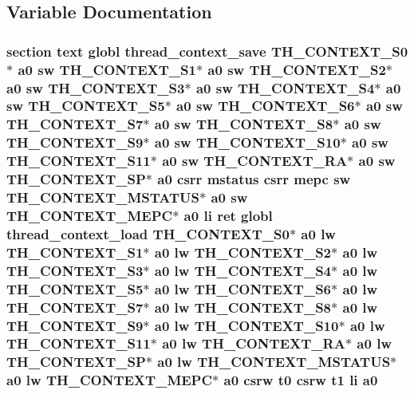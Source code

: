 \subsection{Variable Documentation}
\hypertarget{riscv_2threada_8S_aaef62817c8f68f920ec8214f18b86a4c}{
\subsubsection[{a0}]{\setlength{\rightskip}{0pt plus 5cm}section text globl {\bf thread\-\_\-context\-\_\-save} {\bf T\-H\-\_\-\-C\-O\-N\-T\-E\-X\-T\-\_\-\-S0}$\ast$ a0 {\bf sw} {\bf T\-H\-\_\-\-C\-O\-N\-T\-E\-X\-T\-\_\-\-S1}$\ast$ a0 {\bf sw} {\bf T\-H\-\_\-\-C\-O\-N\-T\-E\-X\-T\-\_\-\-S2}$\ast$ a0 {\bf sw} {\bf T\-H\-\_\-\-C\-O\-N\-T\-E\-X\-T\-\_\-\-S3}$\ast$ a0 {\bf sw} {\bf T\-H\-\_\-\-C\-O\-N\-T\-E\-X\-T\-\_\-\-S4}$\ast$ a0 {\bf sw} {\bf T\-H\-\_\-\-C\-O\-N\-T\-E\-X\-T\-\_\-\-S5}$\ast$ a0 {\bf sw} {\bf T\-H\-\_\-\-C\-O\-N\-T\-E\-X\-T\-\_\-\-S6}$\ast$ a0 {\bf sw} {\bf T\-H\-\_\-\-C\-O\-N\-T\-E\-X\-T\-\_\-\-S7}$\ast$ a0 {\bf sw} {\bf T\-H\-\_\-\-C\-O\-N\-T\-E\-X\-T\-\_\-\-S8}$\ast$ a0 {\bf sw} {\bf T\-H\-\_\-\-C\-O\-N\-T\-E\-X\-T\-\_\-\-S9}$\ast$ a0 {\bf sw} {\bf T\-H\-\_\-\-C\-O\-N\-T\-E\-X\-T\-\_\-\-S10}$\ast$ a0 {\bf sw} {\bf T\-H\-\_\-\-C\-O\-N\-T\-E\-X\-T\-\_\-\-S11}$\ast$ a0 {\bf sw} {\bf T\-H\-\_\-\-C\-O\-N\-T\-E\-X\-T\-\_\-\-R\-A}$\ast$ a0 {\bf sw} {\bf T\-H\-\_\-\-C\-O\-N\-T\-E\-X\-T\-\_\-\-S\-P}$\ast$ a0 csrr {\bf mstatus} csrr {\bf mepc} {\bf sw} {\bf T\-H\-\_\-\-C\-O\-N\-T\-E\-X\-T\-\_\-\-M\-S\-T\-A\-T\-U\-S}$\ast$ a0 {\bf sw} {\bf T\-H\-\_\-\-C\-O\-N\-T\-E\-X\-T\-\_\-\-M\-E\-P\-C}$\ast$ a0 {\bf li} ret globl {\bf thread\-\_\-context\-\_\-load} {\bf T\-H\-\_\-\-C\-O\-N\-T\-E\-X\-T\-\_\-\-S0}$\ast$ a0 {\bf lw} {\bf T\-H\-\_\-\-C\-O\-N\-T\-E\-X\-T\-\_\-\-S1}$\ast$ a0 {\bf lw} {\bf T\-H\-\_\-\-C\-O\-N\-T\-E\-X\-T\-\_\-\-S2}$\ast$ a0 {\bf lw} {\bf T\-H\-\_\-\-C\-O\-N\-T\-E\-X\-T\-\_\-\-S3}$\ast$ a0 {\bf lw} {\bf T\-H\-\_\-\-C\-O\-N\-T\-E\-X\-T\-\_\-\-S4}$\ast$ a0 {\bf lw} {\bf T\-H\-\_\-\-C\-O\-N\-T\-E\-X\-T\-\_\-\-S5}$\ast$ a0 {\bf lw} {\bf T\-H\-\_\-\-C\-O\-N\-T\-E\-X\-T\-\_\-\-S6}$\ast$ a0 {\bf lw} {\bf T\-H\-\_\-\-C\-O\-N\-T\-E\-X\-T\-\_\-\-S7}$\ast$ a0 {\bf lw} {\bf T\-H\-\_\-\-C\-O\-N\-T\-E\-X\-T\-\_\-\-S8}$\ast$ a0 {\bf lw} {\bf T\-H\-\_\-\-C\-O\-N\-T\-E\-X\-T\-\_\-\-S9}$\ast$ a0 {\bf lw} {\bf T\-H\-\_\-\-C\-O\-N\-T\-E\-X\-T\-\_\-\-S10}$\ast$ a0 {\bf lw} {\bf T\-H\-\_\-\-C\-O\-N\-T\-E\-X\-T\-\_\-\-S11}$\ast$ a0 {\bf lw} {\bf T\-H\-\_\-\-C\-O\-N\-T\-E\-X\-T\-\_\-\-R\-A}$\ast$ a0 {\bf lw} {\bf T\-H\-\_\-\-C\-O\-N\-T\-E\-X\-T\-\_\-\-S\-P}$\ast$ a0 {\bf lw} {\bf T\-H\-\_\-\-C\-O\-N\-T\-E\-X\-T\-\_\-\-M\-S\-T\-A\-T\-U\-S}$\ast$ a0 {\bf lw} {\bf T\-H\-\_\-\-C\-O\-N\-T\-E\-X\-T\-\_\-\-M\-E\-P\-C}$\ast$ a0 csrw {\bf t0} csrw {\bf t1} {\bf li} a0}}\label{riscv_2threada_8S_aaef62817c8f68f920ec8214f18b86a4c}
